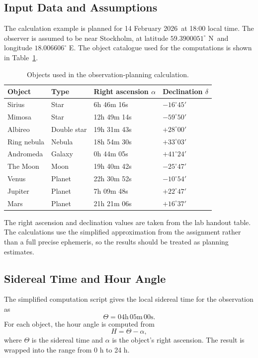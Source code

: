 \documentclass[a4paper,11pt]{article}
\newcommand{\calculationdate}{14 February 2026}
\newcommand{\calculationtime}{18:00 local time}
\newcommand{\observerlatitude}{$59.3900051^\circ$ N}
\newcommand{\observerlongitude}{$18.006606^\circ$ E}
\begin{document}
\subsection{Input Data and Assumptions}
The calculation example is planned for \calculationdate\ at \calculationtime. The observer is assumed to be near Stockholm, at latitude \observerlatitude\ and longitude \observerlongitude. The object catalogue used for the computations is shown in Table~\ref{tab:input-objects}.

\begin{table}[htbp]
    \centering
    \caption{Objects used in the observation-planning calculation.}
    \label{tab:input-objects}
    \begin{tabular}{llll}
        \toprule
        Object & Type & Right ascension $\alpha$ & Declination $\delta$ \\
        \midrule
        Sirius & Star & 6h 46m 16s & $-16^\circ 45'$ \\
        Mimosa & Star & 12h 49m 14s & $-59^\circ 50'$ \\
        Albireo & Double star & 19h 31m 43s & $+28^\circ 00'$ \\
        Ring nebula & Nebula & 18h 54m 30s & $+33^\circ 03'$ \\
        Andromeda & Galaxy & 0h 44m 05s & $+41^\circ 24'$ \\
        The Moon & Moon & 19h 40m 42s & $-25^\circ 47'$ \\
        Venus & Planet & 22h 30m 52s & $-10^\circ 54'$ \\
        Jupiter & Planet & 7h 09m 48s & $+22^\circ 47'$ \\
        Mars & Planet & 21h 21m 06s & $+16^\circ 37'$ \\
        \bottomrule
    \end{tabular}
\end{table}

The right ascension and declination values are taken from the lab handout table. The calculations use the simplified approximation from the assignment rather than a full precise ephemeris, so the results should be treated as planning estimates.

\subsection{Sidereal Time and Hour Angle}
\label{sec:computations}
The simplified computation script gives the local sidereal time for the observation as
\[
    \Theta = 04\mathrm{h}\,05\mathrm{m}\,00\mathrm{s}.
\]
For each object, the hour angle is computed from
\[
    H = \Theta - \alpha,
\]
where $\Theta$ is the sidereal time and $\alpha$ is the object's right ascension. The result is wrapped into the range from 0 h to 24 h.
\end{document}
